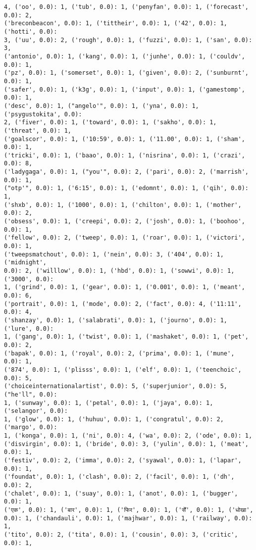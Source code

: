 \documentclass[11pt]{article}
\begin{document}
\begin{Verbatim}[commandchars=\\\{\}]
4, ('oo', 0.0): 1, ('tub', 0.0): 1, ('penyfan', 0.0): 1, ('forecast', 0.0): 2,
('breconbeacon', 0.0): 1, ('tittheir', 0.0): 1, ('42', 0.0): 1, ('hotti', 0.0):
3, ('uu', 0.0): 2, ('rough', 0.0): 1, ('fuzzi', 0.0): 1, ('san', 0.0): 3,
('antonio', 0.0): 1, ('kang', 0.0): 1, ('junhe', 0.0): 1, ('couldv', 0.0): 1,
('pz', 0.0): 1, ('somerset', 0.0): 1, ('given', 0.0): 2, ('sunburnt', 0.0): 1,
('safer', 0.0): 1, ('k3g', 0.0): 1, ('input', 0.0): 1, ('gamestomp', 0.0): 1,
('desc', 0.0): 1, ("angelo'", 0.0): 1, ('yna', 0.0): 1, ('psygustokita', 0.0):
2, ('fiver', 0.0): 1, ('toward', 0.0): 1, ('sakho', 0.0): 1, ('threat', 0.0): 1,
('goalscor', 0.0): 1, ('10:59', 0.0): 1, ('11.00', 0.0): 1, ('sham', 0.0): 1,
('tricki', 0.0): 1, ('baao', 0.0): 1, ('nisrina', 0.0): 1, ('crazi', 0.0): 8,
('ladygaga', 0.0): 1, ("you'", 0.0): 2, ('pari', 0.0): 2, ('marrish', 0.0): 1,
("otp'", 0.0): 1, ('6:15', 0.0): 1, ('edomnt', 0.0): 1, ('qih', 0.0): 1,
('shxb', 0.0): 1, ('1000', 0.0): 1, ('chilton', 0.0): 1, ('mother', 0.0): 2,
('obsess', 0.0): 1, ('creepi', 0.0): 2, ('josh', 0.0): 1, ('boohoo', 0.0): 1,
('fellow', 0.0): 2, ('tweep', 0.0): 1, ('roar', 0.0): 1, ('victori', 0.0): 1,
('tweepsmatchout', 0.0): 1, ('nein', 0.0): 3, ('404', 0.0): 1, ('midnight',
0.0): 2, ('willlow', 0.0): 1, ('hbd', 0.0): 1, ('sowwi', 0.0): 1, ('3000', 0.0):
1, ('grind', 0.0): 1, ('gear', 0.0): 1, ('0.001', 0.0): 1, ('meant', 0.0): 6,
('portrait', 0.0): 1, ('mode', 0.0): 2, ('fact', 0.0): 4, ('11:11', 0.0): 4,
('shanzay', 0.0): 1, ('salabrati', 0.0): 1, ('journo', 0.0): 1, ('lure', 0.0):
1, ('gang', 0.0): 1, ('twist', 0.0): 1, ('mashaket', 0.0): 1, ('pet', 0.0): 2,
('bapak', 0.0): 1, ('royal', 0.0): 2, ('prima', 0.0): 1, ('mune', 0.0): 1,
('874', 0.0): 1, ('plisss', 0.0): 1, ('elf', 0.0): 1, ('teenchoic', 0.0): 5,
('choiceinternationalartist', 0.0): 5, ('superjunior', 0.0): 5, ("he'll", 0.0):
1, ('sunway', 0.0): 1, ('petal', 0.0): 1, ('jaya', 0.0): 1, ('selangor', 0.0):
1, ('glow', 0.0): 1, ('huhuu', 0.0): 1, ('congratul', 0.0): 2, ('margo', 0.0):
1, ('konga', 0.0): 1, ('ni', 0.0): 4, ('wa', 0.0): 2, ('ode', 0.0): 1,
('disvirgin', 0.0): 1, ('bride', 0.0): 3, ('yulin', 0.0): 1, ('meat', 0.0): 1,
('festiv', 0.0): 2, ('imma', 0.0): 2, ('syawal', 0.0): 1, ('lapar', 0.0): 1,
('foundat', 0.0): 1, ('clash', 0.0): 2, ('facil', 0.0): 1, ('dh', 0.0): 2,
('chalet', 0.0): 1, ('suay', 0.0): 1, ('anot', 0.0): 1, ('bugger', 0.0): 1,
('एक', 0.0): 1, ('बार', 0.0): 1, ('फिर', 0.0): 1, ('सेँ', 0.0): 1, ('धोखा',
0.0): 1, ('chandauli', 0.0): 1, ('majhwar', 0.0): 1, ('railway', 0.0): 1,
('tito', 0.0): 2, ('tita', 0.0): 1, ('cousin', 0.0): 3, ('critic', 0.0): 1,

\end{Verbatim}
\end{document}

